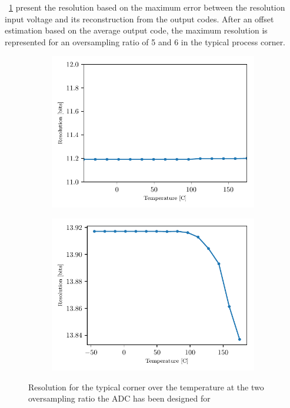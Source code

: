 

\figurename~\ref{fig:adc-res-schematic-temp-tt} present the resolution based on the maximum error between the resolution input voltage and its reconstruction from the output codes. After an offset estimation based on the average output code, the maximum resolution is represented for an oversampling ratio of 5 and 6 in the typical process corner.

\begin{figure}[htp]
    \centering
    \begin{subfigure}[b]{0.48\textwidth}
        \includegraphics[width=\textwidth]{Chapter5/Figs/preliminary/adc_real_ota_osr5_temp.pdf}
    \end{subfigure}
    \begin{subfigure}[b]{0.48\textwidth}
        \includegraphics[width=\textwidth]{Chapter5/Figs/preliminary/adc_real_ota_osr6_temp.pdf}
    \end{subfigure}
    \caption{Resolution for the typical corner over the temperature at the two oversampling ratio the ADC has been designed for}
    \label{fig:adc-res-schematic-temp-tt}
\end{figure}

